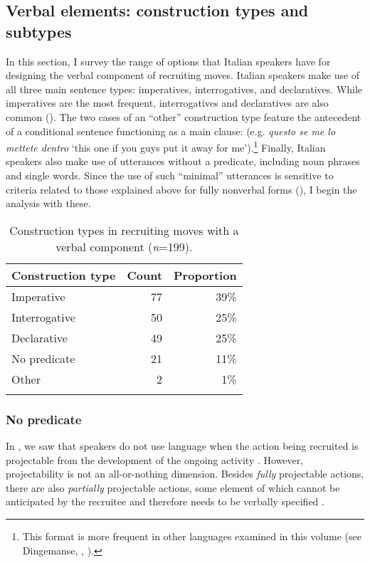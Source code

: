 \documentclass[output=paper,modfonts]{langscibook}
\begin{document}
\subsection{Verbal elements: construction types and subtypes}\label{sec:rossi:3.3}

In this section, I survey the range of options that Italian speakers have for designing the verbal component of recruiting moves. Italian speakers make use of all three main sentence types: imperatives, interrogatives, and declaratives. While imperatives are the most frequent, interrogatives and declaratives are also common (). The two cases of an “other” construction type feature the antecedent of a conditional sentence functioning as a main clause: (e.g. \textit{questo se me lo mettete dentro} ‘this one if you guys put it away for me’).\footnote{This format is more frequent in other languages examined in this volume (see Dingemanse, , ).} Finally, Italian speakers also make use of utterances without a predicate, including noun phrases and single words. Since the use of such “minimal” utterances is sensitive to criteria related to those explained above for fully nonverbal forms (), I begin the analysis with these.

\begin{table}
\begin{tabularx}{.65\textwidth}{Xrr}
\lsptoprule
Construction type & Count & Proportion \\
\midrule
Imperative & 77 & 39\% \\
Interrogative & 50 & 25\% \\
Declarative & 49 & 25\% \\
No predicate & 21 & 11\% \\
Other & 2 & 1\% \\
\lspbottomrule
\end{tabularx}
\caption{Construction types in recruiting moves with a verbal component (\textit{n}=199).}
\label{tab:rossi:2}
\end{table}

\subsubsection{No predicate}\label{sec:rossi:3.3.1}
In , we saw that speakers do not use language when the action being recruited is projectable from the development of the ongoing activity \citep{Rossi2014}. However, projectability is not an all-or-nothing dimension. Besides \textit{fully} projectable actions, there are also \textit{partially} projectable actions, some element of which cannot be anticipated by the recruitee and therefore needs to be verbally specified \citep[54--57]{Rossi2015a}.
\end{document}
